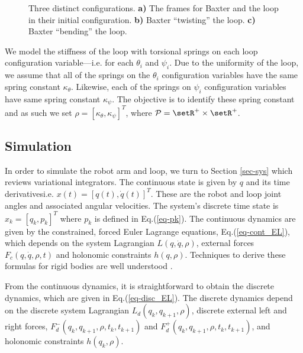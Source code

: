 \documentclass[letterpaper, 10pt, conference]{ieeeconf}
\begin{document}
\begin{figure}
\centering
\def\svgwidth{.97\textwidth}

\caption{Three distinct configurations.  \textbf{a)} The frames for Baxter and the loop in their initial configuration. \textbf{b)} Baxter ``twisting'' the loop. \textbf{c)} Baxter ``bending'' the loop.}
\label{fig-3bloops}
\end{figure}

We model the stiffness of the loop with torsional springs on each loop configuration variable---i.e. for each $\theta_i$ and $\psi_i$.  Due to the uniformity of the loop, we assume that all of the springs on the $\theta_i$ configuration variables have the same spring constant $\kappa_{\theta}$.  Likewise, each of the springs on $\psi_i$ configuration variables have same spring constant $\kappa_{\psi}$.  The objective is to identify these spring constant and as such we set $\rho = [\kappa_{\theta}, \kappa_{\psi}]^T$, where $\mathcal{P} = \setR^+ \times \setR^+$.  

\subsection{Simulation}
In order to simulate the robot arm and loop, we turn to Section \ref{sec-sys} which reviews variational integrators.  The continuous state is given by $q$ and its time derivatives\textemdash i.e. $x(t) = [q(t),\dot{q}(t)]^T$.  These are the robot and loop joint angles and associated angular velocities.  The system's discrete time state is $x_k = [q_k,p_k]^T$ where $p_k$ is defined in Eq.(\ref{eq-pk}).   The continuous dynamics are given by the constrained, forced Euler Lagrange equations, Eq.(\ref{eq-cont_EL}), which depends on the system Lagrangian $L(q,\dot{q},\rho)$, external forces $F_c(q,\dot{q},\rho,t)$ and holonomic constraints $h(q,\rho)$. Techniques to derive these formulas for rigid bodies are well understood \cite{murray_li_sastry}.  

From the continuous dynamics, it is straightforward to obtain the discrete dynamics, which are given in Eq.(\ref{eq-disc_EL}).  The discrete dynamics depend on the discrete system Lagrangian $L_d(q_{k},q_{k+1},\rho)$, discrete external left and right forces, $F_d^-(q_{k},q_{k+1},\rho,t_k,t_{k+1})$ and $F_d^+(q_{k},q_{k+1},\rho,t_k,t_{k+1})$, and holonomic constraints $h(q_k,\rho)$.  
\end{document}
